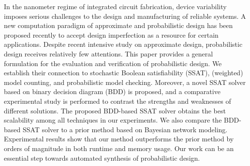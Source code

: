     In the nanometer regime of integrated circuit fabrication, device variability imposes serious challenges to the design and manufacturing of reliable systems. A new computation paradigm of approximate and probabilistic design has been proposed recently to accept design imperfection as a resource for certain applications. Despite recent intensive study on approximate design, probabilistic design receives relatively few attentions. This paper provides a general formulation for the evaluation and verification of probabilistic design. We establish their connection to stochastic Boolean satisfiability (SSAT), (weighted) model counting, and probabilistic model checking. Moreover, a novel SSAT solver based on binary decision diagram (BDD) is proposed, and a comparative experimental study is performed to contrast the strengths and weaknesses of different solutions. The proposed BDD-based SSAT solver obtains the best scalability among all techniques in our experiments. We also compare the BDD-based SSAT solver to a prior method based on Bayesian network modeling. Experimental results show that our method outperforms the prior method by orders of magnitude in both runtime and memory usage. Our work can be an essential step towards automated synthesis of probabilistic design.
\fi
\iffalse
    \textit{Stochastic Boolean Satisfiability} (SSAT) is a logical formalism to model decision problems with uncertainty, such as \textit{Partially Observable Markov Decision Process} (POMDP) for verification of probabilistic systems.
    SSAT, however, is limited by its descriptive power within the PSPACE complexity class.
    More complex problems, such as the NEXPTIME-complete \textit{Decentralized POMDP} (Dec-POMDP), cannot be succinctly encoded with SSAT.
    To provide a logical formalism of such problems, we extend the \textit{Dependency Quantified Boolean Formula} (DQBF), a representative problem in the NEXPTIME-complete class, to its stochastic variant, named \textit{Dependency SSAT} (DSSAT), and show that DSSAT is also NEXPTIME-complete. We demonstrate the potential applications of DSSAT to circuit synthesis of probabilistic and approximate design.
    Furthermore, to study the descriptive power of DSSAT, we establish a polynomial-time reduction from Dec-POMDP to DSSAT.
    With the theoretical foundations paved in this work, we hope to encourage the development of DSSAT solvers for potential broad applications.
\fi